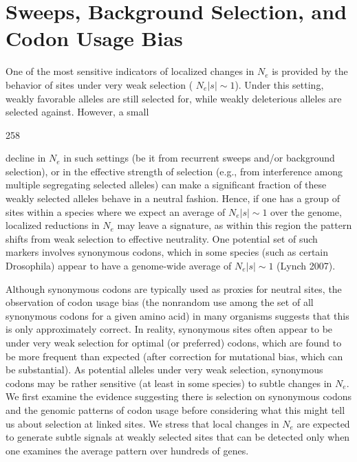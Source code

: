 \documentclass{article}
\begin{document}
\section{Sweeps, Background Selection, and Codon Usage Bias}
One of the most sensitive indicators of localized changes in  $ N_e $ is provided by the behavior of sites under very weak selection ( $ N_e|s| \sim 1 $). Under this setting, weakly favorable alleles are still selected for, while weakly deleterious alleles are selected against. However, a small

258

decline in  $ N_e $ in such settings (be it from recurrent sweeps and/or background selection), or in the effective strength of selection (e.g., from interference among multiple segregating selected alleles) can make a significant fraction of these weakly selected alleles behave in a neutral fashion. Hence, if one has a group of sites within a species where we expect an average of  $ N_e|s| \sim 1 $ over the genome, localized reductions in  $ N_e $ may leave a signature, as within this region the pattern shifts from weak selection to effective neutrality. One potential set of such markers involves synonymous codons, which in some species (such as certain Drosophila) appear to have a genome-wide average of  $ N_e|s| \sim 1 $ (Lynch 2007).

Although synonymous codons are typically used as proxies for neutral sites, the observation of codon usage bias (the nonrandom use among the set of all synonymous codons for a given amino acid) in many organisms suggests that this is only approximately correct. In reality, synonymous sites often appear to be under very weak selection for optimal (or preferred) codons, which are found to be more frequent than expected (after correction for mutational bias, which can be substantial). As potential alleles under very weak selection, synonymous codons may be rather sensitive (at least in some species) to subtle changes in  $ N_{e} $. We first examine the evidence suggesting there is selection on synonymous codons and the genomic patterns of codon usage before considering what this might tell us about selection at linked sites. We stress that local changes in  $ N_{e} $ are expected to generate subtle signals at weakly selected sites that can be detected only when one examines the average pattern over hundreds of genes.
\end{document}
